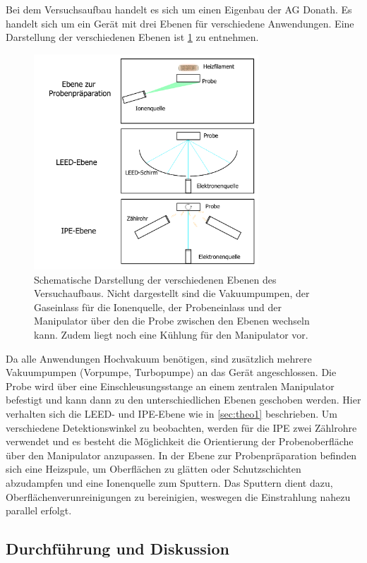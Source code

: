 Bei dem Versuchsaufbau handelt es sich um einen Eigenbau der AG Donath.
Es handelt sich um ein Gerät mit drei Ebenen für verschiedene Anwendungen.
Eine Darstellung der verschiedenen Ebenen ist \cref{fig_ipe_setup} zu entnehmen.
\begin{figure}[!ht]
    \centering
    \includegraphics[width=0.75\textwidth]{img/setup1.png}
    \caption{Schematische Darstellung der verschiedenen Ebenen des Versuchaufbaus.
    Nicht dargestellt sind die Vakuumpumpen, der Gaseinlass für die Ionenquelle, der Probeneinlass und der Manipulator über den die Probe zwischen den Ebenen wechseln kann. Zudem liegt noch eine Kühlung für den Manipulator vor.}
    \label{fig_ipe_setup}
\end{figure}
Da alle Anwendungen Hochvakuum benötigen, sind zusätzlich mehrere Vakuumpumpen (Vorpumpe, Turbopumpe) an das Gerät angeschlossen.
Die Probe wird über eine Einschleusungsstange an einem zentralen Manipulator befestigt und kann dann zu den unterschiedlichen Ebenen geschoben werden.
Hier verhalten sich die LEED- und IPE-Ebene wie in \cref{sec:theo1} beschrieben.
Um verschiedene Detektionswinkel zu beobachten, werden für die IPE zwei Zählrohre verwendet und es besteht die Möglichkeit die Orientierung der Probenoberfläche über den Manipulator anzupassen.
In der Ebene zur Probenpräparation befinden sich eine Heizspule, um Oberflächen zu glätten oder Schutzschichten abzudampfen und eine Ionenquelle zum Sputtern.
Das Sputtern dient dazu, Oberflächenverunreinigungen zu bereinigien, weswegen die Einstrahlung nahezu parallel erfolgt.

\subsection{Durchführung und Diskussion}

